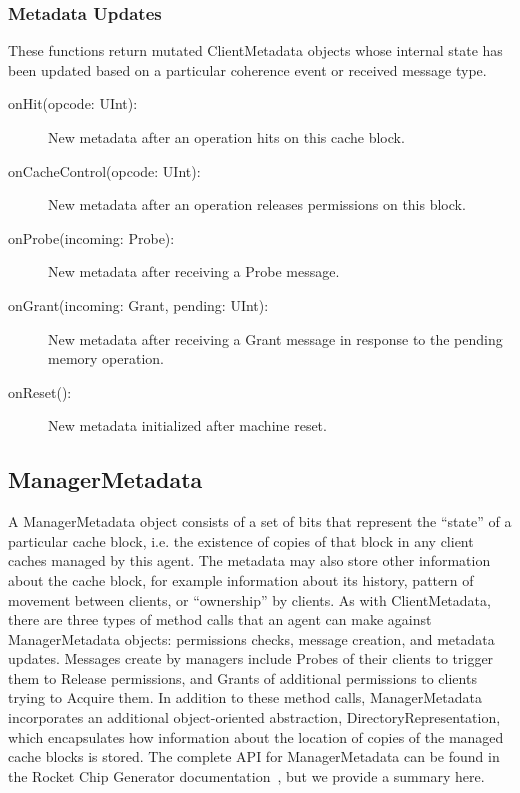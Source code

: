 \subsubsection{Metadata Updates}

These functions return mutated ClientMetadata objects whose internal state has been updated
based on a particular coherence event or received message type.

\begin{description}
\item[onHit(opcode: UInt):]
New metadata after an operation hits on this cache block.
\item[onCacheControl(opcode: UInt):]
New metadata after an operation releases permissions on this block.
\item[onProbe(incoming: Probe):]
New metadata after receiving a Probe message.
\item[onGrant(incoming: Grant, pending: UInt):]
New metadata after receiving a Grant message in response to the pending memory operation.
\item[onReset():]
New metadata initialized after machine reset.
\end{description}

\subsection{ManagerMetadata} 

A ManagerMetadata object consists of a set of bits that represent the ``state''
of a particular cache block,
i.e. the existence of copies of that block in any client caches
managed by this agent.
The metadata may also store other information about the cache block,
for example information about its history, pattern of movement between clients,
or ``ownership'' by clients.
As with ClientMetadata, there are three types of method calls
that an agent can make against ManagerMetadata objects:
permissions checks, message creation, and metadata updates.
Messages create by managers include Probes of their clients to trigger them
to Release permissions, and Grants of additional permissions to clients
trying to Acquire them.
In addition to these method calls, ManagerMetadata incorporates an additional
object-oriented abstraction, DirectoryRepresentation, which encapsulates
how information about the location of copies of the managed cache blocks is stored.
The complete API for ManagerMetadata can be found in the
Rocket Chip Generator documentation~\cite{rocket}, but we provide a summary here.

